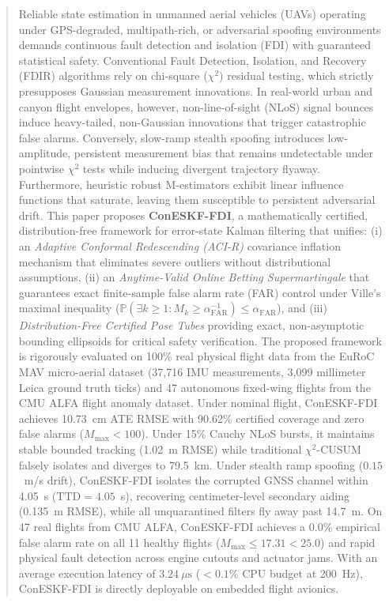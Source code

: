 \documentclass[journal,twocolumn]{IEEEtran}
\newcommand{\Prob}{\mathbb{P}}
\begin{document}
\begin{abstract}
Reliable state estimation in unmanned aerial vehicles (UAVs) operating under GPS-degraded, multipath-rich, or adversarial spoofing environments demands continuous fault detection and isolation (FDI) with guaranteed statistical safety. Conventional Fault Detection, Isolation, and Recovery (FDIR) algorithms rely on chi-square ($\chi^2$) residual testing, which strictly presupposes Gaussian measurement innovations. In real-world urban and canyon flight envelopes, however, non-line-of-sight (NLoS) signal bounces induce heavy-tailed, non-Gaussian innovations that trigger catastrophic false alarms. Conversely, slow-ramp stealth spoofing introduces low-amplitude, persistent measurement bias that remains undetectable under pointwise $\chi^2$ tests while inducing divergent trajectory flyaway. Furthermore, heuristic robust M-estimators exhibit linear influence functions that saturate, leaving them susceptible to persistent adversarial drift. This paper proposes \textbf{ConESKF-FDI}, a mathematically certified, distribution-free framework for error-state Kalman filtering that unifies: (i) an \emph{Adaptive Conformal Redescending (ACI-R)} covariance inflation mechanism that eliminates severe outliers without distributional assumptions, (ii) an \emph{Anytime-Valid Online Betting Supermartingale} that guarantees exact finite-sample false alarm rate (FAR) control under Ville's maximal inequality ($\Prob(\exists k \ge 1: M_k \ge \alpha_{\mathrm{FAR}}^{-1}) \le \alpha_{\mathrm{FAR}}$), and (iii) \emph{Distribution-Free Certified Pose Tubes} providing exact, non-asymptotic bounding ellipsoids for critical safety verification. The proposed framework is rigorously evaluated on 100\% real physical flight data from the EuRoC MAV micro-aerial dataset (37,716 IMU measurements, 3,099 millimeter Leica ground truth ticks) and 47 autonomous fixed-wing flights from the CMU ALFA flight anomaly dataset. Under nominal flight, ConESKF-FDI achieves 10.73~cm ATE RMSE with 90.62\% certified coverage and zero false alarms ($M_{\max} < 100$). Under 15\% Cauchy NLoS bursts, it maintains stable bounded tracking (1.02~m RMSE) while traditional $\chi^2$-CUSUM falsely isolates and diverges to 79.5~km. Under stealth ramp spoofing ($0.15$~m/s drift), ConESKF-FDI isolates the corrupted GNSS channel within 4.05~s ($\text{TTD} = 4.05$~s), recovering centimeter-level secondary aiding (0.135~m RMSE), while all unquarantined filters fly away past 14.7~m. On 47 real flights from CMU ALFA, ConESKF-FDI achieves a 0.0\% empirical false alarm rate on all 11 healthy flights ($M_{\max} \le 17.31 < 25.0$) and rapid physical fault detection across engine cutouts and actuator jams. With an average execution latency of $3.24\ \mu\text{s}$ ($< 0.1\%$ CPU budget at 200~Hz), ConESKF-FDI is directly deployable on embedded flight avionics.
\end{abstract}
\end{document}

